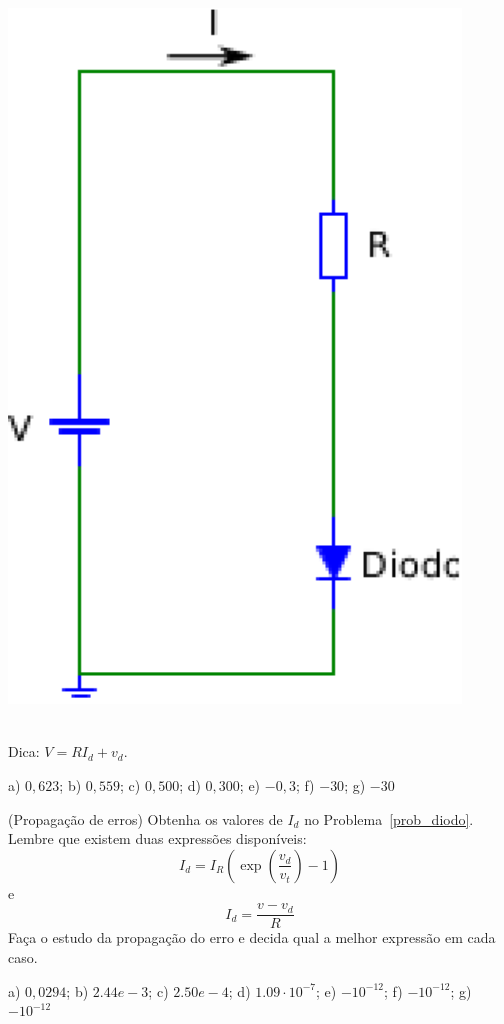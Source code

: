 \begin{ex}
\begin{minipage}[c]{0.4\linewidth}
\includegraphics[width=0.9\textwidth]{./cap_equacao1d/pics/circuito_diodo.eps}
\end{minipage}\\
Dica: $V=RI_d+v_d$.
\begin{resp}
    a) $0,623$; b) $0,559$; c) $0,500$; d) $0,300$; e) $-0,3$; f) $-30$; g) $-30$
\end{resp}

\begin{exer}(Propagação de erros) Obtenha os valores de $I_d$ no Problema~\ref{prob_diodo}. Lembre que existem duas expressões disponíveis:
  \begin{equation}
    I_d=I_R\left(\exp\left(\frac{v_d}{v_t}\right)-1\right)
  \end{equation}
e
\begin{equation}
  I_d=\frac{v-v_d}{R}
\end{equation}
Faça o estudo da propagação do erro e decida qual a melhor expressão em cada caso.
\end{exer}
\begin{resp}
  a) $0,0294$; b) $2.44e-3$; c) $2.50e-4$; d) $1.09\cdot 10^{-7}$; e) $- 10^{-12}$; f) $-10^{-12}$; g) $- 10^{-12}$
\end{resp}


\end{ex}
